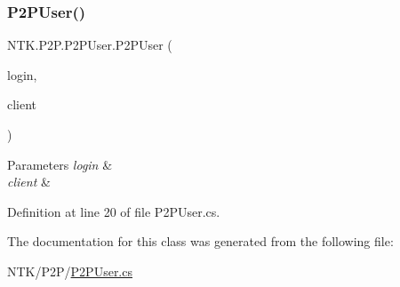 \subsubsection{\texorpdfstring{P2PUser()}{P2PUser()}}
{\footnotesize\ttfamily N\+T\+K.\+P2\+P.\+P2\+P\+User.\+P2\+P\+User (\begin{DoxyParamCaption}\item[{String}]{login,  }\item[{Tcp\+Client}]{client }\end{DoxyParamCaption})}






\begin{DoxyParams}{Parameters}
{\em login} & \\
\hline
{\em client} & \\
\hline
\end{DoxyParams}


Definition at line 20 of file P2\+P\+User.\+cs.



The documentation for this class was generated from the following file\+:\begin{DoxyCompactItemize}
\item 
N\+T\+K/\+P2\+P/\mbox{\hyperlink{_p2_p_user_8cs}{P2\+P\+User.\+cs}}\end{DoxyCompactItemize}
